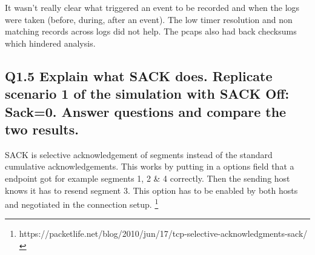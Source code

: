 \documentclass{article}
\begin{document}
It wasn't really clear what triggered an event to be recorded and when the logs were taken (before, during, after an event). The low timer resolution and non matching records across logs did not help. The pcaps also had back checksums which hindered analysis.

\subsection{Q1.5 Explain what SACK does. Replicate scenario 1 of the simulation with SACK Off:  \textbf{Sack=0}. Answer questions and compare the two results.}
SACK is selective acknowledgement of segments instead of the standard cumulative acknowledgements. This works by putting in a options field that a endpoint got for example segments 1, 2 \& 4 correctly. Then the sending host knows it has to resend segment 3. This option has to be enabled by both hosts and negotiated in the connection setup. \footnote{https://packetlife.net/blog/2010/jun/17/tcp-selective-acknowledgments-sack/} 
\end{document}
